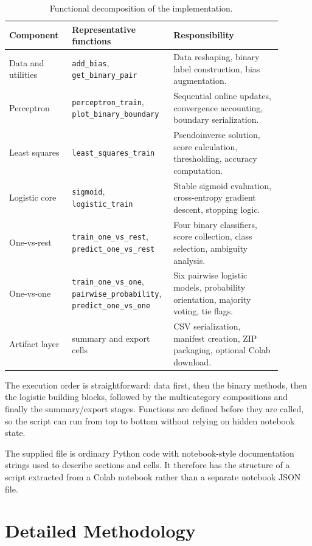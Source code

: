 \documentclass[11pt,a4paper]{article}
\newcommand{\code}[1]{\texttt{#1}}
\begin{document}
\begin{table}[ht]
\centering
\caption{Functional decomposition of the implementation.}
\begin{tabular}{p{0.22\linewidth}p{0.29\linewidth}p{0.38\linewidth}}
\toprule
\textbf{Component} & \textbf{Representative functions} & \textbf{Responsibility}\\
\midrule
Data and utilities & \code{add\_bias}, \code{get\_binary\_pair} & Data reshaping, binary label construction, bias augmentation.\\
Perceptron & \code{perceptron\_train}, \code{plot\_binary\_boundary} & Sequential online updates, convergence accounting, boundary serialization.\\
Least squares & \code{least\_squares\_train} & Pseudoinverse solution, score calculation, thresholding, accuracy computation.\\
Logistic core & \code{sigmoid}, \code{logistic\_train} & Stable sigmoid evaluation, cross-entropy gradient descent, stopping logic.\\
One-vs-rest & \code{train\_one\_vs\_rest}, \code{predict\_one\_vs\_rest} & Four binary classifiers, score collection, class selection, ambiguity analysis.\\
One-vs-one & \code{train\_one\_vs\_one}, \code{pairwise\_probability}, \code{predict\_one\_vs\_one} & Six pairwise logistic models, probability orientation, majority voting, tie flags.\\
Artifact layer & summary and export cells & CSV serialization, manifest creation, ZIP packaging, optional Colab download.\\
\bottomrule
\end{tabular}
\end{table}

The execution order is straightforward: data first, then the binary methods, then the logistic building blocks, followed by the multicategory compositions and finally the summary/export stages. Functions are defined before they are called, so the script can run from top to bottom without relying on hidden notebook state.

The supplied file is ordinary Python code with notebook-style documentation strings used to describe sections and cells. It therefore has the structure of a script extracted from a Colab notebook rather than a separate notebook JSON file.

\section{Detailed Methodology}
\end{document}
